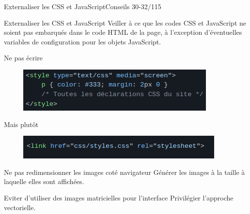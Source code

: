 \begin{frame}{Externaliser les CSS et JavaScript}{Conseils 30-32/115}

\begin{block}{Externaliser les CSS et JavaScript}
Veiller à ce que les codes CSS et JavaScript ne soient pas embarqués dans le code HTML de la page, à l’exception d’éventuelles variables de configuration pour les objets JavaScript.


\begin{minipage}[b]{0.5\linewidth}
\begin{alertblock}{Ne pas écrire}
\begin{figure}
    \includegraphics[scale=0.4]{chapitre2/wdd3/fig/c7.png}
    \centering
\end{figure}
 \end{alertblock}
\end{minipage}\hfill
\begin{minipage}[b]{0.45\linewidth}
\begin{exampleblock}{Mais plutôt}
\begin{figure}
    \includegraphics[scale=0.35]{chapitre2/wdd3/fig/c8.png}
    \centering
\end{figure}
 \end{exampleblock}
\end{minipage}\hfill

\end{block}

\begin{block}{Ne pas redimensionner les images coté navigateur}
Générer les images à la taille à laquelle elles sont affichées.
\end{block}


\begin{block}{Eviter d'utiliser des images matricielles pour l'interface}
Privilégier l'approche vectorielle.
\end{block}


\end{frame}






